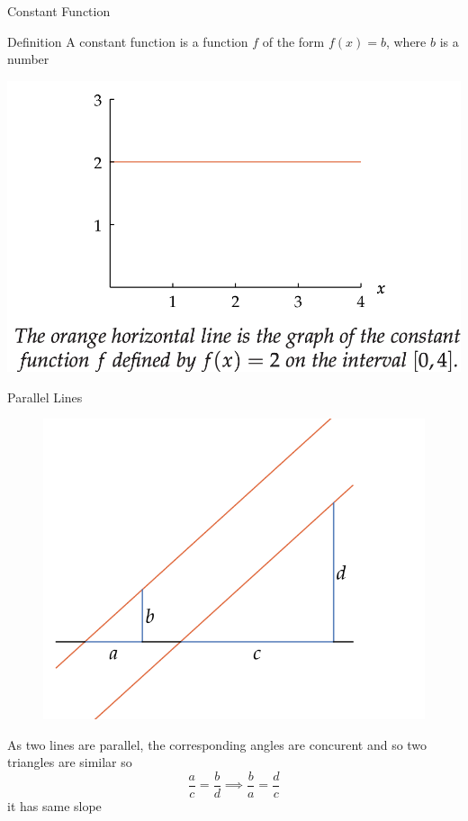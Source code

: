 \documentclass{beamer}
\begin{document}
\begin{frame}{Constant Function}
    \begin{block}{Definition}
      A constant function is a function \(f\) of the form \(f (x) = b\),  where \(b\) is a number 
    \end{block}
    \centering
    \includegraphics[width=0.6\linewidth]{constant.png} 
  \end{frame}

  \begin{frame}{Parallel Lines}
    \begin{figure}
      \centering
      \includegraphics[scale=0.2]{parallel.png}
    \end{figure}
    As two lines are parallel, the corresponding angles are concurent and so two triangles are similar so 
\[\frac{a}{c} = \frac{b}{d} \implies \frac{b}{a} = \frac{d}{c}  \] 
it has same slope
  \end{frame}
\end{document}
